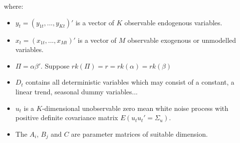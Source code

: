 \documentclass[10pt, a4paper, landscape]{extarticle}
\begin{document}
\begin{multicols}{3}
where:
\begin{itemize}[leftmargin=*]
	\item $y_t = (y_{1t}, ..., y_{Kt})'$ is a vector of $K$ observable endogenous variables.
	\item $x_t = (x_{1t}, ..., x_{Mt})'$ is a vector of $M$ observable exogenous or unmodelled variables.
	\item $\Pi = \alpha \beta'$. Suppose $rk(\Pi) = r = rk(\alpha) = rk(\beta)$
	\item $D_t$ contains all deterministic variables which may consist of a constant, a linear trend, seasonal dummy variables...
	\item $u_t$ is a $K$-dimensional unobservable zero mean white noise process with positive definite covariance matrix $E(u_t u_t' = \Sigma_u)$.
	\item The $A_i$, $B_j$ and $C$ are parameter matrices of suitable dimension.
\end{itemize}


\end{multicols}
\end{document}
